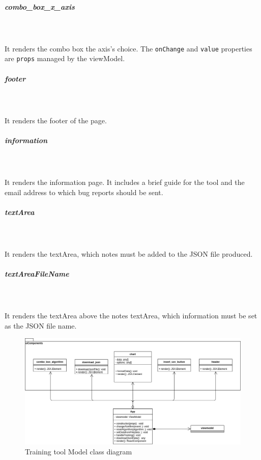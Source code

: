 \subparagraph*{combo\_box\_x\_axis}\mbox{} \\ \mbox{} \\
It renders the combo box the axis's choice.
The \texttt{onChange} and \texttt{value} properties are \texttt{props} managed by the viewModel.

\subparagraph*{footer}\mbox{} \\ \mbox{} \\
It renders the footer of the page.

\subparagraph*{information}\mbox{} \\ \mbox{} \\
It renders the information page. It includes a brief guide for the tool and the email address to which bug reports should be sent.

\subparagraph*{textArea}\mbox{} \\ \mbox{} \\
It renders the textArea, which notes must be added to the JSON file produced.

\subparagraph*{textAreaFileName}\mbox{} \\ \mbox{} \\
It renders the textArea above the notes textArea, which information must be set as the JSON file name.

\begin{figure}[H]
\centering
\includegraphics[scale=0.45]{../../../Diagrams/Classes_diagrams/tool_view.png}
\caption{Training tool Model class diagram}
\end{figure}

